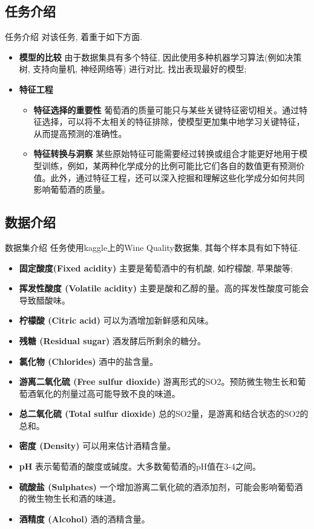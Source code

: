 \documentclass{beamer}
\begin{document}
\subsection{任务介绍}
\begin{frame}[fragile]{任务介绍}
	对该任务, 着重于如下方面.
	\begin{itemize}
		\item \textbf{模型的比较 } 由于数据集具有多个特征, 因此使用多种机器学习算法(例如决策树, 支持向量机, 神经网络等) 进行对比, 找出表现最好的模型;
		\item \textbf{特征工程 }
		      \begin{itemize}
			      \item \textbf{特征选择的重要性 }葡萄酒的质量可能只与某些关键特征密切相关。通过特征选择，可以将不太相关的特征排除，使模型更加集中地学习关键特征，从而提高预测的准确性。
			      \item \textbf{特征转换与洞察 }某些原始特征可能需要经过转换或组合才能更好地用于模型训练，例如，某两种化学成分的比例可能比它们各自的数值更有预测价值。此外，通过特征工程，还可以深入挖掘和理解这些化学成分如何共同影响葡萄酒的质量。
		      \end{itemize}
	\end{itemize}
\end{frame}
\subsection{数据介绍}
\begin{frame}[fragile]{数据集介绍}
	任务使用kaggle上的Wine Quality数据集, 其每个样本具有如下特征.
	\begin{itemize}
		\item \textbf{固定酸度(Fixed acidity)} 主要是葡萄酒中的有机酸, 如柠檬酸, 苹果酸等;
		\item \textbf{挥发性酸度 (Volatile acidity)} 主要是酸和乙醇的量。高的挥发性酸度可能会导致醋酸味。
		\item \textbf{柠檬酸 (Citric acid)} 可以为酒增加新鲜感和风味。
		\item \textbf{残糖 (Residual sugar)} 酒发酵后所剩余的糖分。
		\item \textbf{氯化物 (Chlorides)} 酒中的盐含量。
		\item \textbf{游离二氧化硫 (Free sulfur dioxide)} 游离形式的SO2。预防微生物生长和葡萄酒氧化的剂量过高可能导致不良的味道。
		\item \textbf{总二氧化硫 (Total sulfur dioxide)} 总的SO2量，是游离和结合状态的SO2的总和。
		\item \textbf{密度 (Density)} 可以用来估计酒精含量。
		\item \textbf{pH} 表示葡萄酒的酸度或碱度。大多数葡萄酒的pH值在3-4之间。
		\item \textbf{硫酸盐 (Sulphates)} 一个增加游离二氧化硫的酒添加剂，可能会影响葡萄酒的微生物生长和酒的味道。
		\item \textbf{酒精度 (Alcohol)} 酒的酒精含量。
	\end{itemize}
\end{frame}
\end{document}
